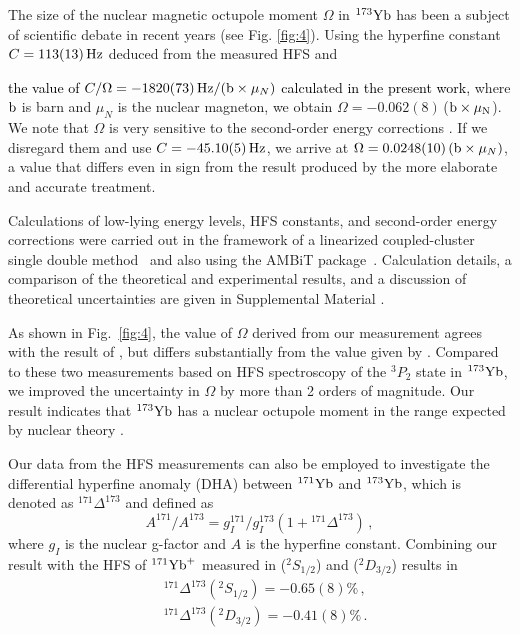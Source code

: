 \documentclass[
reprint,
superscriptaddress,









amsmath,amssymb,
aps,prl






]{revtex4-2}
\newcommand{\m}[1]{\textcolor{black}{#1}}
\begin{document}
The size of the nuclear magnetic octupole moment $\Omega$ in $^{173}\rm{}Yb$ has been a subject of scientific debate \cite{Singh2013,Xiao2020} in recent years (see Fig. \ref{fig:4}).
Using the hyperfine constant $C=113(13)\,{\rm Hz}$ deduced from the measured HFS and

\m{the value of $C/\Omega = -1820(73)\,{\rm Hz}/({\rm b} \times \mu_N)$ calculated in the present work},
where $\rm{}b$ is barn and $\mu_N$ is the nuclear magneton, we obtain $\Omega = -0.062(8)$\,($\rm{b} \times\mu_N$).
We note that $\Omega$ is very sensitive to the second-order energy corrections \cite{Schwartz1955}. If we disregard them and use $C=-45.10(5)\,{\rm Hz}$, we arrive at $\Omega = 0.0248 (10) \,({\rm b} \times \mu_N)$, a value that differs even in sign from the result produced by the more elaborate and accurate treatment.

Calculations of low-lying energy levels, HFS constants, and second-order energy corrections were carried out in the framework of a linearized coupled-cluster single double method~\cite{BlaJohSap91} and also using the AMBiT package~\cite{KAHL2019}. Calculation details, a comparison of the theoretical and experimental results, and a discussion of theoretical uncertainties are given in Supplemental Material \cite{appendixA}.

As shown in Fig.~\ref{fig:4}, the value of $\Omega$ derived from our measurement agrees with the result of \citet{Groote2021}, but differs substantially from the value given by \citet{Singh2013}.
Compared to these two measurements based on HFS spectroscopy of the $^{3}\!P_2$ state in $^{173}\rm{Yb}$, we improved the uncertainty in $\Omega$ by more than 2 orders of magnitude.
Our result indicates that $^{173}\rm{Yb}$ has a nuclear octupole moment in the range expected by nuclear theory \cite{Schwartz1955, Williams1962, Xiao2020}.


Our data from the HFS measurements can also be employed to investigate the differential hyperfine anomaly (DHA) \cite{Bohr1950, Roberts2021} between $^{171}\rm{Yb}$ and $^{173}\rm{Yb}$, which is denoted as ${}^{171}\Delta^{173}$ and defined as
\begin{equation}
A^{171}/A^{173}=g^{171}_I/g^{173}_I(1+{}^{171}\Delta^{173})\,, \nonumber
\end{equation}
where $g_I$ is the nuclear g-factor and $A$ is the hyperfine constant. Combining our result with the HFS of $^{171}\rm{Yb}^+$ measured in \cite{Han2024} ($^2\!S_{1/2}$) and \cite{Tamm2014} ($^2\!D_{3/2}$) results in
\begin{align}
&{}^{171}\Delta^{173}(^2\!S_{1/2})=-0.65(8)\% \, , \nonumber
\\ &{}^{171}\Delta^{173}(^2\!D_{3/2})=-0.41(8)\% \, . \nonumber
\end{align}
\end{document}
